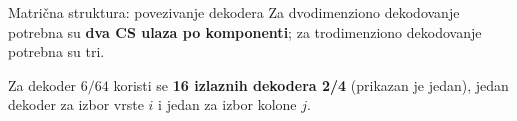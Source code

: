 \begin{frame}[label=03-s010]{Matrična struktura: povezivanje dekodera}
Za dvodimenziono dekodovanje potrebna su \textbf{dva CS ulaza po komponenti};
za trodimenziono dekodovanje potrebna su tri.
\par\vspace{1mm}
{\centering\par}
\par\vspace{1mm}
Za dekoder \(6/64\) koristi se \textbf{16 izlaznih dekodera 2/4} (prikazan je jedan),
jedan dekoder za izbor vrste \(i\) i jedan za izbor kolone \(j\).
\end{frame}
